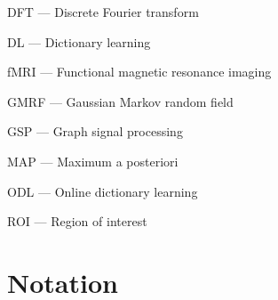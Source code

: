 \documentclass[a4paper,12pt,openany]{book}
\begin{document}

DFT --- Discrete Fourier transform

DL --- Dictionary learning




fMRI --- Functional magnetic resonance imaging

GMRF --- Gaussian Markov random field

GSP --- Graph signal processing







MAP --- Maximum a posteriori





ODL --- Online dictionary learning




ROI --- Region of interest






\section*{Notation}
\end{document}
